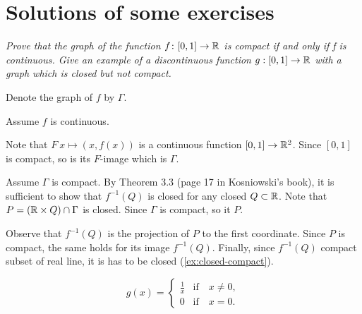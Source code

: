 \chapter{Solutions of some exercises}

\textit{Prove that the graph of the function $f\colon [0,1] \to \mathbb{R}$ is compact if and
only if f is continuous.
Give an example of a discontinuous function
$g: [0,1] \to \mathbb{R}$ with a graph which is closed but not compact.}

Denote the graph of $f$ by $\Gamma$.

Assume $f$ is continuous.

Note that $F\:x\mapsto (x,f(x))$ is a continuous function $[0,1]\to\mathbb{R}^2$.
Since $[0,1]$ is compact, so is its $F$-image which is $\Gamma$.


Assume $\Gamma$ is compact.
By Theorem 3.3 (page 17 in Kosniowski's book), it is sufficient to show that $f^{-1}(Q)$ is closed for any closed $Q\subset \mathbb{R}$.
Note that $P=(\mathbb{R}\times Q)\cap\Gamma$ is closed.
Since $\Gamma$ is compact, so it $P$.

Observe that $f^{-1}(Q)$ is the projection of $P$ to the first coordinate.
Since $P$ is compact, the same holds for its image $f^{-1}(Q)$.
Finally, since $f^{-1}(Q)$ compact subset of real line, it is has to be closed (\ref{ex:closed-compact}).

\[g(x)=
\begin{cases}
\tfrac1x&\text{if}\quad x\ne0,
\\
0&\text{if}\quad x=0.
\end{cases}
\]
